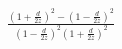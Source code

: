 \documentclass[preview]{standalone}
\begin{document}
\begin{align*}
\frac{\left ( 1+\frac{d}{2z} \right )^{2} - \left ( 1-\frac{d}{2z} \right )^{2} }{\left ( 1-\frac{d}{2z} \right )^{2}\left ( 1+\frac{d}{2z} \right )^{2}}
\end{align*}
\end{document}
